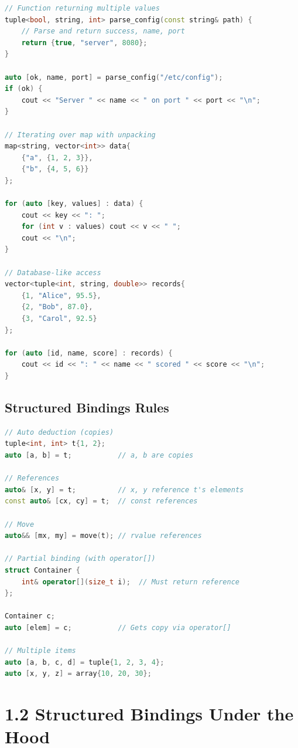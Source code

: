 \begin{lstlisting}[language={C++}]
// Function returning multiple values
tuple<bool, string, int> parse_config(const string& path) {
    // Parse and return success, name, port
    return {true, "server", 8080};
}

auto [ok, name, port] = parse_config("/etc/config");
if (ok) {
    cout << "Server " << name << " on port " << port << "\n";
}

// Iterating over map with unpacking
map<string, vector<int>> data{
    {"a", {1, 2, 3}},
    {"b", {4, 5, 6}}
};

for (auto [key, values] : data) {
    cout << key << ": ";
    for (int v : values) cout << v << " ";
    cout << "\n";
}

// Database-like access
vector<tuple<int, string, double>> records{
    {1, "Alice", 95.5},
    {2, "Bob", 87.0},
    {3, "Carol", 92.5}
};

for (auto [id, name, score] : records) {
    cout << id << ": " << name << " scored " << score << "\n";
}
\end{lstlisting}

\hypertarget{structured-bindings-rules}{%
\subsection{Structured Bindings Rules}\label{structured-bindings-rules}}

\begin{lstlisting}[language={C++}]
// Auto deduction (copies)
tuple<int, int> t{1, 2};
auto [a, b] = t;           // a, b are copies

// References
auto& [x, y] = t;          // x, y reference t's elements
const auto& [cx, cy] = t;  // const references

// Move
auto&& [mx, my] = move(t); // rvalue references

// Partial binding (with operator[])
struct Container {
    int& operator[](size_t i);  // Must return reference
};

Container c;
auto [elem] = c;           // Gets copy via operator[]

// Multiple items
auto [a, b, c, d] = tuple{1, 2, 3, 4};
auto [x, y, z] = array{10, 20, 30};
\end{lstlisting}

\hypertarget{structured-bindings-under-the-hood}{%
\section{1.2 Structured Bindings Under the
Hood}\label{structured-bindings-under-the-hood}}

